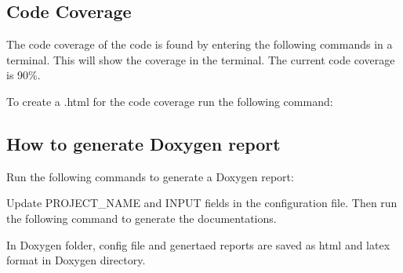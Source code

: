\subsection*{Code Coverage}

The code coverage of the code is found by entering the following commands in a terminal. This will show the coverage in the terminal. The current code coverage is 90\%. 
\begin{DoxyCode}{0}
\end{DoxyCode}
 To create a .html for the code coverage run the following command\+: 
\begin{DoxyCode}{0}
\end{DoxyCode}


\subsection*{How to generate Doxygen report}

Run the following commands to generate a Doxygen report\+: 
\begin{DoxyCode}{0}
\end{DoxyCode}
 Update P\+R\+O\+J\+E\+C\+T\+\_\+\+N\+A\+ME and I\+N\+P\+UT fields in the configuration file. Then run the following command to generate the documentations. 
\begin{DoxyCode}{0}
\end{DoxyCode}
 In Doxygen folder, config file and genertaed reports are saved as html and latex format in Doxygen directory. 